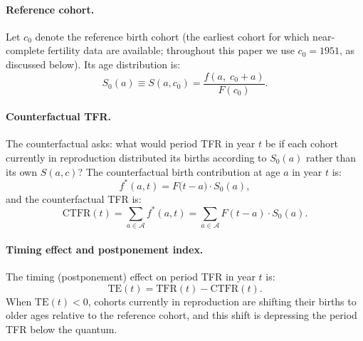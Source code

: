 \documentclass[12pt]{article}
\begin{document}
\paragraph{Reference cohort.}
Let $c_0$ denote the reference birth cohort (the earliest cohort for
which near-complete fertility data are available; throughout this paper
we use $c_0 = 1951$, as discussed below).  Its age distribution is:
\begin{equation}
    S_0(a) \equiv S(a, c_0) = \frac{f(a,\; c_0 + a)}{F(c_0)}.
    \label{eq:ref_dist}
\end{equation}

\paragraph{Counterfactual TFR.}
The counterfactual asks: what would period TFR in year $t$ be if each
cohort currently in reproduction distributed its births according to
$S_0(a)$ rather than its own $S(a,c)$?  The counterfactual birth
contribution at age $a$ in year $t$ is:
\begin{equation}
    f^*(a, t) = F\!\bigl(t - a\bigr) \cdot S_0(a),
    \label{eq:cf_births}
\end{equation}
and the counterfactual TFR is:
\begin{equation}
    \mathrm{CTFR}(t) = \sum_{a \in \mathcal{A}} f^*(a,t)
                      = \sum_{a \in \mathcal{A}} F(t-a) \cdot S_0(a).
    \label{eq:CTFR}
\end{equation}

\paragraph{Timing effect and postponement index.}
The timing (postponement) effect on period TFR in year $t$ is:
\begin{equation}
    \mathrm{TE}(t) = \mathrm{TFR}(t) - \mathrm{CTFR}(t).
    \label{eq:TE}
\end{equation}
When $\mathrm{TE}(t) < 0$, cohorts currently in reproduction are
shifting their births to older ages relative to the reference cohort,
and this shift is depressing the period TFR below the quantum.
\end{document}
